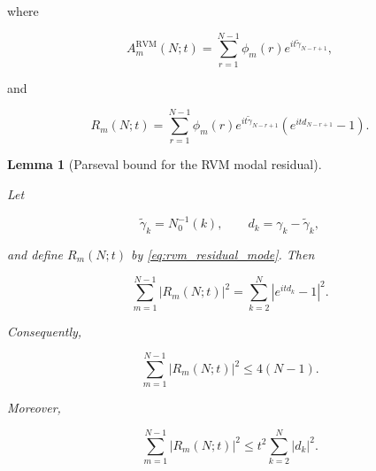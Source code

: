 \documentclass[11pt]{amsart}
\numberwithin{equation}{section}
\theoremstyle{plain}
\newtheorem{lemma}[theorem]{Lemma}
\theoremstyle{definition}
\theoremstyle{remark}
\begin{document}
where

\begin{equation}
A_m^{\mathrm{RVM}}(N;t)
=
\sum_{r=1}^{N-1}
\phi_m(r)
e^{it\widetilde\gamma_{N-r+1}},
\label{eq:rvm_background_mode}
\end{equation}

and

\begin{equation}
R_m(N;t)
=
\sum_{r=1}^{N-1}
\phi_m(r)
e^{it\widetilde\gamma_{N-r+1}}
\left(
e^{itd_{N-r+1}}-1
\right).
\label{eq:rvm_residual_mode}
\end{equation}

\begin{lemma}[Parseval bound for the RVM modal residual]
\label{lem:rvm_residual_parseval_bound}

Let

\begin{equation}
\widetilde\gamma_k=N_0^{-1}(k),
\qquad
d_k=\gamma_k-\widetilde\gamma_k,
\end{equation}

and define \(R_m(N;t)\) by \eqref{eq:rvm_residual_mode}. Then

\begin{equation}
\sum_{m=1}^{N-1}|R_m(N;t)|^2
=
\sum_{k=2}^{N}
|e^{itd_k}-1|^2.
\label{eq:rvm_residual_parseval_bound}
\end{equation}

Consequently,

\begin{equation}
\sum_{m=1}^{N-1}|R_m(N;t)|^2
\le
4(N-1).
\label{eq:rvm_residual_uniform_bound}
\end{equation}

Moreover,

\begin{equation}
\sum_{m=1}^{N-1}|R_m(N;t)|^2
\le
t^2\sum_{k=2}^{N}|d_k|^2.
\label{eq:rvm_residual_small_displacement_bound}
\end{equation}

\end{lemma}
\end{document}
